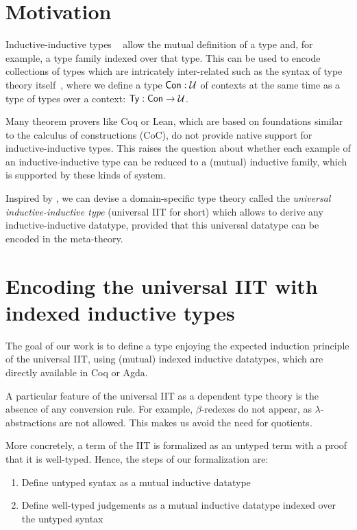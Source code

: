 \section{Motivation}
Inductive-inductive types ~\cite{nordvallinductive, gabephd}
allow the mutual definition of a type and, for example, a type family indexed
over that type.
This can be used to encode collections of types which are intricately inter-related
such as the syntax of type theory itself~\cite{ttintt}, where we define a type $\mathsf{Con} : \mathcal{U}$
of contexts at the same time as a type of types over a context: $\mathsf{Ty} : \mathsf{Con} \to \mathcal{U}$.

Many theorem provers like Coq or Lean, which
are based on foundations similar to the calculus of constructions (CoC),
do not provide native support for inductive-inductive types.
This raises the question about whether each example of an inductive-inductive
type can be reduced to a (mutual) inductive family, which is supported by these
kinds of system.

Inspired by \cite{qiit}, we can devise a domain-specific type theory called the \emph{universal
  inductive-inductive type} (universal IIT for short)  which allows
to derive any inductive-inductive datatype, provided that this universal
datatype can be encoded in the meta-theory.

\section{Encoding the universal IIT with indexed inductive types}

The goal of our work is to define a type enjoying the expected induction principle of the universal IIT, using
 (mutual) indexed inductive datatypes, which are directly available in Coq or Agda.

A particular feature of the universal IIT as a dependent type theory is the absence of any conversion rule. For example, $\beta$-redexes do not appear, as $\lambda$-abstractions are not allowed. This makes us avoid the need for quotients.

More concretely, a term of the IIT is formalized as an untyped term with a proof that it is well-typed.
Hence, the steps of our formalization are:
\begin{enumerate}
\item Define untyped syntax as a mutual inductive datatype
\item Define well-typed judgements as a mutual inductive datatype indexed over the untyped syntax
\end{enumerate}


